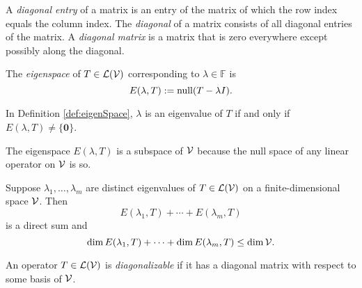 \begin{defn}
  A \emph{diagonal entry} of a matrix
  is an entry of the matrix of which the row index
  equals the column index.
  The \emph{diagonal} of a matrix
  consists of all diagonal entries of the matrix.
  A \emph{diagonal matrix} is a matrix
  that is zero everywhere except possibly
  along the diagonal.
\end{defn}

\begin{defn}
  \label{def:eigenSpace}
  The \emph{eigenspace} of $T\in {\cal L}({\cal V})$
  corresponding to $\lambda\in \mathbb{F}$ is
  \begin{equation}
    \label{eq:eigenSpace}
    E(\lambda, T) := \mathrm{null}(T-\lambda I).
  \end{equation}
\end{defn}

\begin{rem}
  In Definition \ref{def:eigenSpace}, 
  $\lambda$ is an eigenvalue of $T$
  if and only if $E(\lambda,T)\ne \{\mathbf{0}\}$.
\end{rem}

\begin{rem}
  The eigenspace $E(\lambda,T)$
  is a subspace of ${\cal V}$
  because the null space of any linear operator on ${\cal V}$ is so.
\end{rem}

\begin{lem}
  Suppose $\lambda_1, \ldots, \lambda_m$ are distinct eigenvalues
  of $T\in {\cal L}({\cal V})$
  on a finite-dimensional space ${\cal V}$.
  Then
  \begin{displaymath}
    E(\lambda_1, T) + \cdots + E(\lambda_m, T) 
  \end{displaymath}
  is a direct sum and
  \begin{equation}
    \dim E(\lambda_1, T) + \cdots + \dim E(\lambda_m, T) \le \dim {\cal V}.
  \end{equation}
\end{lem}

\begin{defn}
  An operator $T\in {\cal L}({\cal V})$ is \emph{diagonalizable}
  if it has a diagonal matrix with respect to some basis of ${\cal V}$.
\end{defn}

